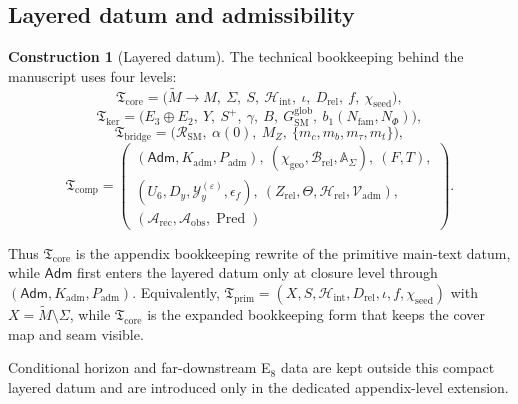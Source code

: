 \documentclass[11pt,a4paper]{article}
\theoremstyle{definition}
\newtheorem{construction}[theorem]{Construction}
\theoremstyle{remark}
\newcommand{\Seam}{\Sigma}
\newcommand{\inv}{\iota}
\newcommand{\bone}{b_1}
\newcommand{\SM}{\mathrm{SM}}
\newcommand{\Arec}{\mathcal A_{\mathrm{rec}}}
\newcommand{\Aobs}{\mathcal A_{\mathrm{obs}}}
\newcommand{\Vadm}{\mathcal V_{\mathrm{adm}}}
\newcommand{\Hrel}{\mathcal H_{\mathrm{rel}}}
\newcommand{\Pred}{\operatorname{Pred}}
\newcommand{\Hint}{\mathcal H_{\mathrm{int}}}
\newcommand{\Kadm}{K_{\mathrm{adm}}}
\newcommand{\Tprim}{\mathfrak T_{\mathrm{prim}}}
\newcommand{\chiseed}{\chi_{\mathrm{seed}}}
\newcommand{\chigeo}{\chi_{\mathrm{geo}}}
\newcommand{\Tcore}{\mathfrak T_{\mathrm{core}}}
\newcommand{\Tbridge}{\mathfrak T_{\mathrm{bridge}}}
\newcommand{\Tker}{\mathfrak T_{\mathrm{ker}}}
\newcommand{\Tcomp}{\mathfrak T_{\mathrm{comp}}}
\newcommand{\Padm}{P_{\mathrm{adm}}}
\begin{document}
\subsection{Layered datum and admissibility}

\begin{construction}[Layered datum]
The technical bookkeeping behind the manuscript uses four levels:
\[
\Tcore
=
\bigl(
\widetilde M\to M,\ \Seam,\ S,\ \Hint,\ \inv,\ D_{\mathrm{rel}},\ f,\ \chiseed
\bigr),
\]
\[
\Tker
=
\bigl(
E_3\oplus E_2,\ Y,\ S^+,\ \gamma,\ B,\ G_{\SM}^{\mathrm{glob}},\ \bone(N_{\mathrm{fam}},N_\Phi)
\bigr),
\]
\[
\Tbridge
=
\bigl(
\mathcal R_{\SM},\ \alpha(0),\ M_Z,\ \{m_c,m_b,m_\tau,m_t\}
\bigr),
\]
\[
\Tcomp
=
\left(
\begin{array}{l}
(\mathsf{Adm},\Kadm,\Padm),\ (\chigeo,\mathcal B_{\mathrm{rel}},\mathbb A_{\Seam}),\ (F,T),\\
(U_6,D_y,\mathcal Y_y^{(\varepsilon)},\epsilon_f),\ (Z_{\mathrm{rel}},\Theta,\Hrel,\Vadm),\\
(\Arec,\Aobs,\Pred)
\end{array}
\right).
\]
\end{construction}

Thus $\Tcore$ is the appendix bookkeeping rewrite of the primitive main-text datum, while $\mathsf{Adm}$ first enters the layered datum only at closure level through $(\mathsf{Adm},\Kadm,\Padm)$.
Equivalently, $\Tprim=(X,S,\Hint,D_{\mathrm{rel}},\inv,f,\chiseed)$ with
$X=\widetilde M\setminus\Seam$, while $\Tcore$ is the expanded bookkeeping form
that keeps the cover map and seam visible.

Conditional horizon and far-downstream E$_8$ data are kept outside this compact layered datum and are introduced only in the dedicated appendix-level extension.
\end{document}
